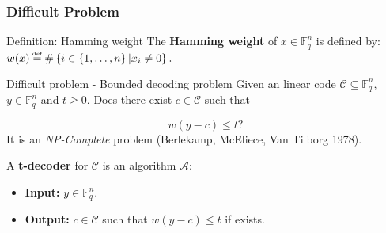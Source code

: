 \documentclass[
10pt, %
%
aspectratio=169, %
]{beamer}
\theoremstyle{plain}%
\theoremstyle{definition}
\theoremstyle{remark}
\newcommand{\calA}{\mathcal{A}}
\newcommand{\calC}{\mathcal{C}}
\newcommand{\fq}{\mathbb{F}_{q}}
\newcommand\myeq{\mathrel{\stackrel{\makebox[0pt]{\mbox{\normalfont\tiny def}}}{=}}}
\begin{document}
	\begin{frame}
		\frametitle{Difficult Problem}
		\begin{block}{Definition: Hamming weight}
			The \textbf{Hamming weight} of $x \in \fq^n$ is defined by:
			$w(x)\myeq \# \left\lbrace i \in \{1,\dots,n\} \, | x_i\neq 0\right\rbrace.$
		\end{block}
		\begin{alertblock}{Difficult problem - Bounded decoding problem }
			Given an linear code $\calC \subseteq \fq^n $, $y\in \fq^n$ and $t \geq 0$. Does there exist $c \in \calC$ such that
		
			\[w(y-c) \leq t ?\]
			It is an \textit{NP-Complete} problem (Berlekamp, McEliece, Van Tilborg 1978).
		\end{alertblock}
		A \textbf{t-decoder} for $\calC$ is an algorithm $\calA$:
		\begin{itemize}
		
			\item \textbf{Input:} $y\in \fq^n$.
			\item \textbf{Output:} $ c\in \calC$ such that  $w(y-c)\leq t $ if exists.
		\end{itemize}
	\end{frame}
\end{document}
